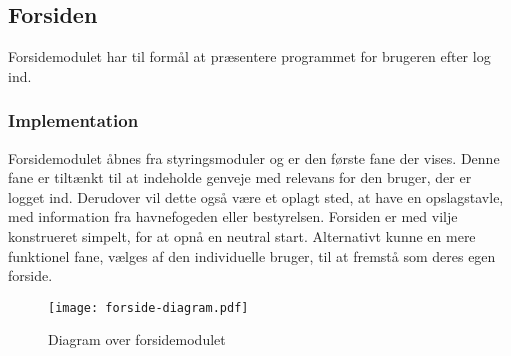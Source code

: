 \subsection{Forsiden}
\label{sub:Welcome}

Forsidemodulet har til formål at præsentere programmet for brugeren efter log ind.

\subsubsection{Implementation}
\label{ssub:Welcome_implementation}
Forsidemodulet åbnes fra styringsmoduler og er den første fane der vises. Denne fane er tiltænkt til at indeholde genveje med relevans for den bruger, der er logget ind. Derudover vil dette også være et oplagt sted, at have en opslagstavle, med  information fra havnefogeden eller bestyrelsen. Forsiden er med vilje konstrueret simpelt, for at opnå en neutral start. Alternativt kunne en mere funktionel fane, vælges af den individuelle bruger, til at fremstå som deres egen forside.


\begin{figure}
  \centering
  \texttt{[image: forside-diagram.pdf]}
  \caption{Diagram over forsidemodulet}
  \label{fig:forsidemod}
\end{figure}
